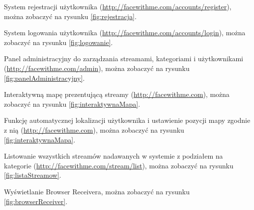 \begin{packed_item}
    \item{System rejestracji użytkownika (\url{http://facewithme.com/accounts/register}), można zobaczyć na rysunku \ref{fig:rejestracja}.}
    \item{System logowania użytkownika (\url{http://facewithme.com/accounts/login}), można zobaczyć na rysunku \ref{fig:logowanie}.}
    \item{Panel administracyjny do zarządzania streamami, kategoriami i użytkownikami (\url{http://facewithme.com/admin}), można zobaczyć na rysunku \ref{fig:panelAdministracyjny}.}
    \item{Interaktywną mapę prezentującą streamy (\url{http://facewithme.com}), można zobaczyć na rysunku \ref{fig:interaktywnaMapa}.}
    \item{Funkcję automatycznej lokalizacji użytkownika i ustawienie pozycji mapy zgodnie z nią (\url{http://facewithme.com}), można zobaczyć na rysunku \ref{fig:interaktywnaMapa}.}
    \item{Listowanie wszystkich streamów nadawanych w systemie z podziałem na kategorie (\url{http://facewithme.com/stream/list}), można zobaczyć na rysunku \ref{fig:listaStreamow}.}
    \item{Wyświetlanie Browser Receivera, można zobaczyć na rysunku \ref{fig:browserReceiver}.}
\end{packed_item}

